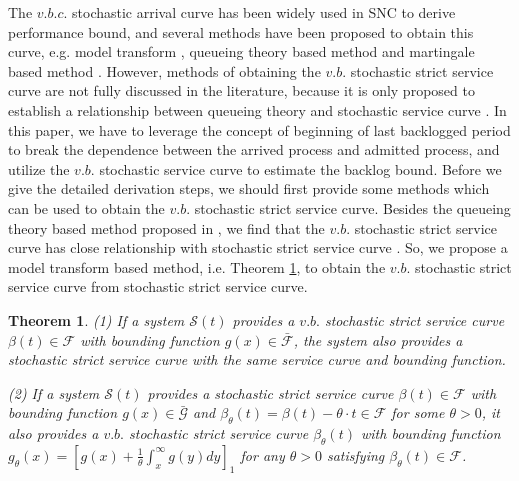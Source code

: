 \documentclass[12pt]{article}
\newtheorem{theorem}{Theorem}
\begin{document}
The $v.b.c.$ stochastic arrival curve has been widely used in SNC to derive performance bound, and several methods have been proposed to obtain this curve, e.g. model transform \cite{jiang2006basic,Wu2010Model,JiangLiu-15877}, queueing theory based method \cite{Wu2010Model} and martingale based method \cite{jiang2010note}. However, methods of obtaining the $v.b.$ stochastic strict service curve are not fully discussed in the literature, because it is only proposed to establish a relationship between queueing theory and stochastic service curve \cite{Wu2010Model}. In this paper, we have to leverage the concept of beginning of last backlogged period \cite{Fidl06} to break the dependence between the arrived process and admitted process, and utilize the $v.b.$ stochastic service curve to estimate the backlog bound. Before we give the detailed derivation steps, we should first provide some methods which can be used to obtain the $v.b.$ stochastic strict service curve. Besides the queueing theory based method proposed in \cite{Wu2010Model}, we find that the $v.b.$ stochastic strict service curve has close relationship with stochastic strict service curve \cite{JiangLiu-15877}. So, we propose a model transform based method, i.e. Theorem \ref{mtrans}, to obtain the $v.b.$ stochastic strict service curve from stochastic strict service curve.
\begin{theorem}\label{mtrans}
(1) If a system $\mathcal{S}(t)$ provides a $v.b.$ stochastic strict service curve $\beta(t)\in\mathcal{F}$ with bounding function $g(x)\in\bar{\mathcal{F}}$, the system also provides a stochastic strict service curve with the same service curve and bounding function.

(2) If a system $\mathcal{S}(t)$ provides a stochastic strict service curve $\beta(t)\in\mathcal{F}$ with bounding function $g(x)\in\bar{\mathcal{G}}$ and $\beta_{\theta}(t)=\beta(t)-\theta\cdot t\in\mathcal{F}$ for some $\theta>0$, it also provides a $v.b.$ stochastic strict service curve $\beta_{\theta}(t)$ with bounding function $g_{\theta}(x)=[g(x)+\frac{1}{\theta}\int_x^\infty g(y)dy]_1$ for any $\theta>0$ satisfying $\beta_{\theta}(t)\in\mathcal{F}$.
\end{theorem}
\end{document}
